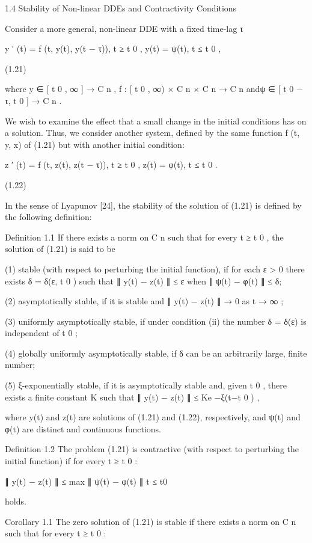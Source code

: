 \documentclass[12pt]{article}
\begin{document}
1.4 Stability of Non-linear DDEs and Contractivity Conditions

Consider a more general, non-linear DDE with a ﬁxed time-lag τ

y ′ (t) = f (t, y(t), y(t − τ)), t ≥ t 0 , y(t) = ψ(t), t ≤ t 0 ,

(1.21)

where y ∈ [ t 0 , ∞ ] → C n , f : [ t 0 , ∞) × C n × C n → C n andψ ∈ [ t 0 − τ, t 0 ] → C n .

We wish to examine the effect that a small change in the initial conditions has on a solution. Thus, we consider another system, deﬁned by 
the same function f (t, y, x) of (1.21) but with another initial condition:

z ′ (t) = f (t, z(t), z(t − τ)), t ≥ t 0 , z(t) = φ(t), t ≤ t 0 .

(1.22)

In the sense of Lyapunov [24], the stability of the solution of (1.21) is deﬁned by the following deﬁnition:

Deﬁnition 1.1 If there exists a norm on C n such that for every t ≥ t 0 , the solution of (1.21) is said to be

(1) stable (with respect to perturbing the initial function), if for each ε > 0 there exists δ = δ(ε, t 0 ) such that ∥ y(t) − z(t) ∥ ≤ ε 
when ∥ ψ(t) − φ(t) ∥ ≤ δ;

(2) asymptotically stable, if it is stable and ∥ y(t) − z(t) ∥ → 0 as t → ∞ ;

(3) uniformly asymptotically stable, if under condition (ii) the number δ = δ(ε) is independent of t 0 ;

(4) globally uniformly asymptotically stable, if δ can be an arbitrarily large, ﬁnite number;

(5) ξ-exponentially stable, if it is asymptotically stable and, given t 0 , there exists a ﬁnite constant K such that ∥ y(t) − z(t) ∥ ≤ 
Ke −ξ(t−t 0 ) ,

where y(t) and z(t) are solutions of (1.21) and (1.22), respectively, and ψ(t) and φ(t) are distinct and continuous functions.

Deﬁnition 1.2 The problem (1.21) is contractive (with respect to perturbing the initial function) if for every t ≥ t 0 :

∥ y(t) − z(t) ∥ ≤ max ∥ ψ(t) − φ(t) ∥ t ≤ t0 

holds.

Corollary 1.1 The zero solution of (1.21) is stable if there exists a norm on C n such that for every t ≥ t 0 :
\end{document}

